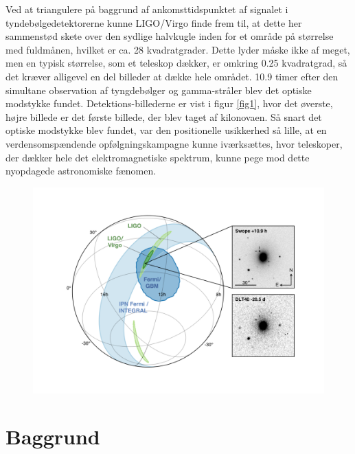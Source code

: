 \documentclass[twocolumn]{article}
\begin{document}
Ved at triangulere på baggrund af ankomsttidspunktet af signalet i tyndebølgedetektorerne kunne LIGO/Virgo finde frem til, at dette her sammenstød skete over den sydlige halvkugle inden for et område på størrelse med fuldmånen, hvilket er ca. 28 kvadratgrader. Dette lyder måske ikke af meget, men en typisk størrelse, som et teleskop dækker, er omkring 0.25 kvadratgrad, så det kræver alligevel en del billeder at dække hele området. 10.9 timer efter den simultane observation af tyngdebølger og gamma-stråler blev det optiske modstykke fundet. Detektions-billederne er vist i figur \ref{fig1}, hvor det øverste, højre billede er det første billede, der blev taget af kilonovaen. Så snart det optiske modstykke blev fundet, var den positionelle usikkerhed så lille, at en verdensomspændende opfølgningskampagne kunne iværksættes, hvor teleskoper, der dækker hele det elektromagnetiske spektrum, kunne pege mod dette nyopdagede astronomiske fænomen.

\begin{figure}
\includegraphics[width=\columnwidth]{GW170817_MMA_Skymap} 
\end{figure}





\section{Baggrund}\label{bag}
\end{document}
